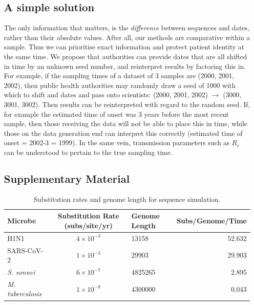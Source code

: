 \documentclass{article}
\begin{document}
\begin{spacing}{1.5}
\subsection*{A simple solution}
The only information that matters, is the \emph{difference} between sequences and dates, rather than their absolute values. After all, our methods are comparative within a sample. Thus we can prioritise exact information and protect patient identity at the same time. We propose that authorities can provide dates that are all shifted in time by an unknown seed number, and reinterpret results by factoring this in. For example, if the sampling times of a dataset of 3 samples are (2000, 2001, 2002), then public health authorities may randomly draw a seed of 1000 with which to shift and dates and pass onto scientists: (2000, 2001, 2002) $\rightarrow$ (3000, 3001, 3002). Then results can be reinterpreted with regard to the random seed. If, for example the estimated time of onset was 3 years before the most recent sample, then those receiving the data will not be able to place this in time, while those on the data generation end can interpret this correctly (estimated time of onset = 2002-3 = 1999). In the same vein, transmission parameters such as $R_e$ can be understood to pertain to the true sampling time.

\end{spacing}




\subsection*{Supplementary Material}

\renewcommand{\thefigure}{S\arabic{figure}}
\setcounter{figure}{0}

\begin{table}[h!]
    \centering
    \caption{Substitution rates and genome length for sequence simulation.}
    \begin{tabular}{l|c|l|r}
    \hline
    Microbe                     &   Substitution Rate (subs/site/yr) & Genome Length & Subs/Genome/Time  \\
    \hline
    H1N1                        & $4\times10^{-3}$ & 13158 & 52.632\\
    SARS-CoV-2                  & $1\times10^{-3}$ & 29903 & 29.903\\
    \textit{S. sonnei}    & $6\times10^{-7}$ & 4825265  & 2.895\\
    \textit{M. tuberculosis}    &   $1\times10^{-8}$ & 4300000 & 0.043\\
    \hline
    \end{tabular}
    \label{tab:seq_parms}
\end{table}
\end{document}
